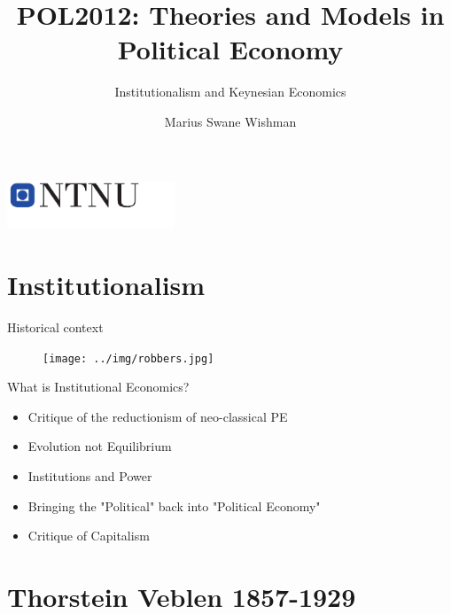 \documentclass{beamer}
\title{POL2012: Theories and Models in Political Economy}
\subtitle{Institutionalism and Keynesian Economics}
\date{}
\author{Marius Swane Wishman}
\institute{Department of Sociology and Political Science}
\begin{document}
\begin{frame}[plain]
\titlepage %
\centering %
\includegraphics[width=5cm]{logo_ntnu_u-slagord.pdf}
\end{frame}


\section{Institutionalism} %

\begin{frame}{Historical context}
              \begin{figure}
                \texttt{[image: ../img/robbers.jpg]}
                \label{fig:robbers}
             \end{figure}{}
\end{frame}{}

\begin{frame}{What is Institutional Economics?} %
      \begin{itemize}[<+- | alert@+>]
        \item Critique of the reductionism of neo-classical PE
        \item Evolution not Equilibrium
        \item Institutions and Power
        \item Bringing the "Political" back into "Political Economy"
        \item Critique of Capitalism %
      \end{itemize}
\end{frame}{}

\section{Thorstein Veblen 1857-1929}
\end{document}

